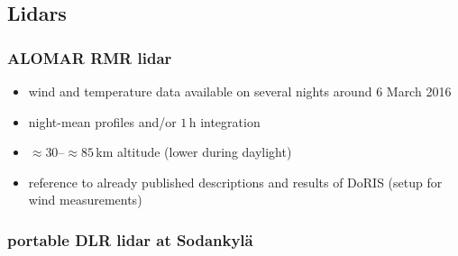 \subsection{Lidars}

\subsubsection{ALOMAR RMR lidar}
\begin{itemize}
  \item wind and temperature data available on several nights around 6 March 2016
  \item night-mean profiles and/or $1$\,h integration
  \item $\approx 30$--$\approx85$\,km altitude (lower during daylight)
  \medskip
  \item reference to already published descriptions and results of DoRIS (setup for wind measurements)
\end{itemize}

\subsubsection{portable DLR lidar at Sodankyl\"a}